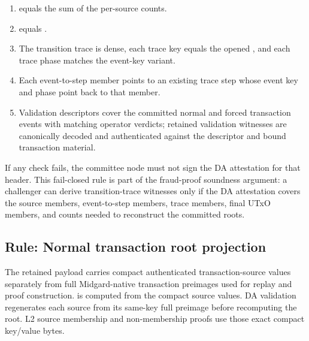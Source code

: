 \documentclass[../midgard.tex]{subfiles}
\begin{document}
\begin{enumerate}
    \item {} equals the sum of the per-source counts.
    \item {} equals .
    \item The transition trace is dense, each trace key equals the opened , and each trace phase matches the event-key variant.
    \item Each event-to-step member points to an existing trace step whose event key and phase point back to that member.
    \item Validation descriptors cover the committed normal and forced transaction events with matching operator verdicts; retained validation witnesses are canonically decoded and authenticated against the descriptor and bound transaction material.
\end{enumerate}

If any check fails, the committee node must not sign the DA attestation for that header.
This fail-closed rule is part of the fraud-proof soundness argument: a challenger can derive transition-trace witnesses only if the DA attestation covers the source members, event-to-step members, trace members, final UTxO members, and counts needed to reconstruct the committed roots.

\subsection{Rule: Normal transaction root projection}

The retained payload carries compact authenticated transaction-source values
separately from full Midgard-native transaction preimages used for replay and
proof construction.  is computed from the compact
source values. DA validation regenerates each source from its same-key full
preimage before recomputing the root. L2 source membership and non-membership
proofs use those exact compact key/value bytes.
\end{document}
